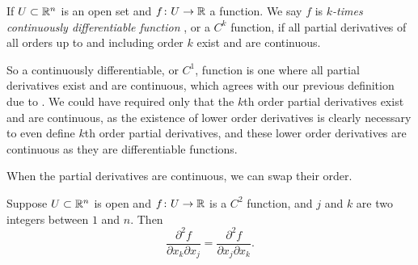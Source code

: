 \begin{defn}
If $U \subset {\mathbb{R}}^n$ is an open set and
$f \colon U \to {\mathbb{R}}$ a function.  We say $f$ is
\emph{$k$-times continuously differentiable function}%
,
or a $C^k$ function, if all partial derivatives of all orders up to and
including order $k$ exist and are continuous.
\end{defn}

So a continuously differentiable, or $C^1$, function is one where all partial
derivatives exist and are continuous, which agrees with our previous
definition due to .  We
could have required only that the $k$th order partial derivatives exist and
are continuous, as the existence of lower order derivatives is clearly
necessary to even define $k$th order partial derivatives,
and these lower order derivatives are continuous as they are differentiable
functions.

When the partial derivatives are continuous, we can swap their order.

\begin{prop} \label{mv:prop:swapders}
Suppose $U \subset {\mathbb{R}}^n$ is open and $f \colon U \to {\mathbb{R}}$ is a $C^2$
function, and $j$ and $k$ are two integers between $1$ and $n$.  Then
\begin{equation*}
\frac{\partial^2 f}{\partial x_k \partial x_j}
=
\frac{\partial^2 f}{\partial x_j \partial x_k} .
\end{equation*}
\end{prop}

